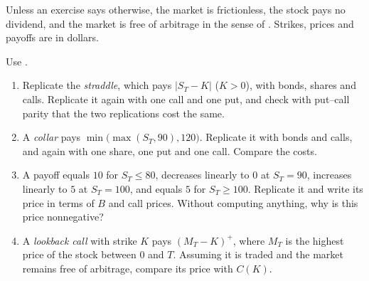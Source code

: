 
Unless an exercise says otherwise, the market is frictionless, the stock pays no dividend,
and the market is free of arbitrage in the sense of . Strikes,
prices and payoffs are in dollars.

\begin{exercise}\label{ex:arb-payoffs}
\easy Use .
\begin{enumerate}[label=(\alph*)]
  \item Replicate the \emph{straddle}, which pays $|S_T-K|$ ($K>0$), with bonds, shares and
    calls.
    Replicate it again with one call and one put, and check with put--call parity that the
    two replications cost the same.
  \item A \emph{collar} pays $\min\big(\max(S_T,90),120\big)$. Replicate it with bonds and
    calls, and again with one share, one put and one call. Compare the costs.
  \item A payoff equals $10$ for $S_T\le80$, decreases linearly to $0$ at $S_T=90$, increases
    linearly to $5$ at $S_T=100$, and equals $5$ for $S_T\ge100$. Replicate it and write its
    price in terms of $B$ and call prices. Without computing anything, why is this price
    nonnegative?
  \item A \emph{lookback call} with strike $K$ pays $(M_T-K)^+$, where $M_T$ is the highest
    price of the stock between $0$ and $T$. Assuming it is traded and the market remains free
    of arbitrage, compare its price with $C(K)$.
\end{enumerate}
\end{exercise}

